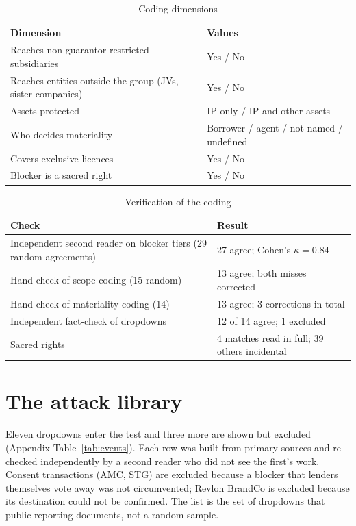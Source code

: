 \documentclass[12pt]{article}
\begin{document}
\begin{table}[!htbp]\centering
\begin{threeparttable}
\caption{Coding dimensions}\label{tab:coding}
\begin{tabularx}{0.85\linewidth}{Ll}
\toprule
Dimension & Values\\\midrule
Reaches non-guarantor restricted subsidiaries & Yes / No\\
Reaches entities outside the group (JVs, sister companies) & Yes / No\\
Assets protected & IP only / IP and other assets\\
Who decides materiality & Borrower / agent / not named / undefined\\
Covers exclusive licences & Yes / No\\
Blocker is a sacred right & Yes / No\\
\bottomrule
\end{tabularx}
\end{threeparttable}
\end{table}

\begin{table}[!htbp]\centering
\begin{threeparttable}
\caption{Verification of the coding}\label{tab:verify}
\begin{tabularx}{0.92\linewidth}{Ll}
\toprule
Check & Result\\\midrule
Independent second reader on blocker tiers (29 random agreements) & 27 agree; Cohen's $\kappa=0.84$\\
Hand check of scope coding (15 random) & 13 agree; both misses corrected\\
Hand check of materiality coding (14) & 13 agree; 3 corrections in total\\
Independent fact-check of dropdowns & 12 of 14 agree; 1 excluded\\
Sacred rights & 4 matches read in full; 39 others incidental\\
\bottomrule
\end{tabularx}
\end{threeparttable}
\end{table}

\section{The attack library}\label{sec:attacks}
Eleven dropdowns enter the test and three more are shown but excluded (Appendix Table~\ref{tab:events}). Each row was built from primary sources and re-checked independently by a second reader who did not see the first's work. Consent transactions (AMC, STG) are excluded because a blocker that lenders themselves vote away was not circumvented; Revlon BrandCo is excluded because its destination could not be confirmed. The list is the set of dropdowns that public reporting documents, not a random sample.
\end{document}
